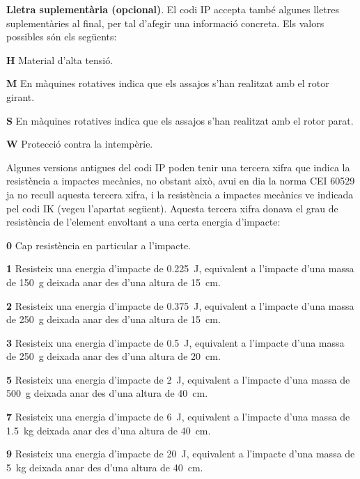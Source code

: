 \textbf{Lletra suplementària (opcional)}. El codi IP accepta també algunes
lletres suplementàries al final, per tal d'afegir una informació concreta. Els valors
possibles són els següents:
\begin{list}{}
   {\setlength{\labelwidth}{10mm} \setlength{\leftmargin}{10mm} \setlength{\labelsep}{2mm}}
   \item[\textbf{H}] Material d'alta tensió.
   \item[\textbf{M}] En màquines rotatives indica que els assajos s'han realitzat amb el
    rotor girant.
   \item[\textbf{S}] En màquines rotatives indica que els assajos s'han realitzat amb el
    rotor parat.
   \item[\textbf{W}] Protecció contra la intempèrie.
\end{list}


Algunes versions antigues del codi IP poden tenir una tercera xifra que indica la resistència a impactes mecànics, no obstant això, avui en dia la norma CEI 60529 ja no recull aquesta tercera xifra, i la resistència a impactes mecànics ve indicada pel codi IK (vegeu l'apartat següent). Aquesta tercera xifra donava el grau de resistència de l'element envoltant a una certa energia d'impacte:
\begin{list}{}
   {\setlength{\labelwidth}{10mm} \setlength{\leftmargin}{10mm} \setlength{\labelsep}{2mm}}
   \item[\textbf{0}] Cap resistència en particular a l'impacte.
   \item[\textbf{1}] Resisteix una energia d'impacte de \qty{0,225}{J}, equivalent a l'impacte d'una massa de \qty{150}{g} deixada anar des d'una altura de \qty{15}{cm}.
   \item[\textbf{2}] Resisteix una energia d'impacte de \qty{0,375}{J}, equivalent a l'impacte d'una massa de \qty{250}{g} deixada anar des d'una altura de \qty{15}{cm}.
   \item[\textbf{3}] Resisteix una energia d'impacte de \qty{0,5}{J}, equivalent a l'impacte d'una massa de \qty{250}{g} deixada anar des d'una altura de \qty{20}{cm}.
   \item[\textbf{5}] Resisteix una energia d'impacte de \qty{2}{J}, equivalent a l'impacte d'una massa de \qty{500}{g} deixada anar des d'una altura de \qty{40}{cm}.
   \item[\textbf{7}] Resisteix una energia d'impacte de \qty{6}{J}, equivalent a l'impacte d'una massa de \qty{1,5}{kg} deixada anar des d'una altura de \qty{40}{cm}.
   \item[\textbf{9}]Resisteix una energia d'impacte de \qty{20}{J}, equivalent a l'impacte d'una massa de \qty{5}{kg} deixada anar des d'una altura de \qty{40}{cm}.
\end{list}

